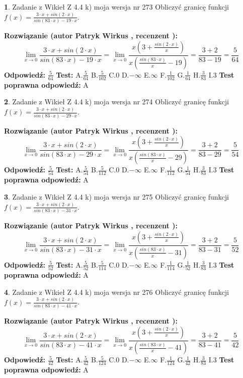 \documentclass[12pt, a4paper]{article}
\theoremstyle{definition} %
\newtheorem{zad}{}
\newcommand{\zadStart}[1]{\begin{zad}#1\newline}
\newcommand{\zadStop}{\end{zad}}
\newcommand{\rozwStart}[2]{\noindent \textbf{Rozwiązanie (autor #1 , recenzent #2): }\newline}
\newcommand{\rozwStop}{\newline}
\newcommand{\odpStart}{\noindent \textbf{Odpowiedź:}\newline}
\newcommand{\odpStop}{\newline}
\newcommand{\testStart}{\noindent \textbf{Test:}\newline}
\newcommand{\testStop}{\newline}
\newcommand{\kluczStart}{\noindent \textbf{Test poprawna odpowiedź:}\newline}
\newcommand{\kluczStop}{\newline}
\begin{document}
\zadStart{Zadanie z Wikieł Z 4.4 k) moja wersja nr 273}
Obliczyć granicę funkcji $f(x)=\frac{3\cdot x +sin(2\cdot x)}{sin(83\cdot x) -19\cdot x}$.
\zadStop
\rozwStart{Patryk Wirkus}{}
$$\lim\limits_{x\to 0}\frac{3\cdot x +sin(2\cdot x)}{sin(83\cdot x) -19\cdot x}
=\lim\limits_{x\to 0}\frac{x(3+\frac{sin(2\cdot x)}{x})}{x(\frac{sin(83\cdot x)}{x}-19)}
=\frac{3+2}{83-19} = \frac{5}{64}$$
\rozwStop
\odpStart
$\frac{5}{64}$
\odpStop
\testStart
A.$\frac{5}{64}$
B.$\frac{5}{102}$
C.$0$
D.$-\infty$
E.$\infty$
F.$\frac{1}{102}$
G.$\frac{1}{64}$
H.$\frac{3}{83}$
I.$3$
\testStop
\kluczStart
A
\kluczStop



\zadStart{Zadanie z Wikieł Z 4.4 k) moja wersja nr 274}
Obliczyć granicę funkcji $f(x)=\frac{3\cdot x +sin(2\cdot x)}{sin(83\cdot x) -29\cdot x}$.
\zadStop
\rozwStart{Patryk Wirkus}{}
$$\lim\limits_{x\to 0}\frac{3\cdot x +sin(2\cdot x)}{sin(83\cdot x) -29\cdot x}
=\lim\limits_{x\to 0}\frac{x(3+\frac{sin(2\cdot x)}{x})}{x(\frac{sin(83\cdot x)}{x}-29)}
=\frac{3+2}{83-29} = \frac{5}{54}$$
\rozwStop
\odpStart
$\frac{5}{54}$
\odpStop
\testStart
A.$\frac{5}{54}$
B.$\frac{5}{112}$
C.$0$
D.$-\infty$
E.$\infty$
F.$\frac{1}{112}$
G.$\frac{1}{54}$
H.$\frac{3}{83}$
I.$3$
\testStop
\kluczStart
A
\kluczStop



\zadStart{Zadanie z Wikieł Z 4.4 k) moja wersja nr 275}
Obliczyć granicę funkcji $f(x)=\frac{3\cdot x +sin(2\cdot x)}{sin(83\cdot x) -31\cdot x}$.
\zadStop
\rozwStart{Patryk Wirkus}{}
$$\lim\limits_{x\to 0}\frac{3\cdot x +sin(2\cdot x)}{sin(83\cdot x) -31\cdot x}
=\lim\limits_{x\to 0}\frac{x(3+\frac{sin(2\cdot x)}{x})}{x(\frac{sin(83\cdot x)}{x}-31)}
=\frac{3+2}{83-31} = \frac{5}{52}$$
\rozwStop
\odpStart
$\frac{5}{52}$
\odpStop
\testStart
A.$\frac{5}{52}$
B.$\frac{5}{114}$
C.$0$
D.$-\infty$
E.$\infty$
F.$\frac{1}{114}$
G.$\frac{1}{52}$
H.$\frac{3}{83}$
I.$3$
\testStop
\kluczStart
A
\kluczStop



\zadStart{Zadanie z Wikieł Z 4.4 k) moja wersja nr 276}
Obliczyć granicę funkcji $f(x)=\frac{3\cdot x +sin(2\cdot x)}{sin(83\cdot x) -41\cdot x}$.
\zadStop
\rozwStart{Patryk Wirkus}{}
$$\lim\limits_{x\to 0}\frac{3\cdot x +sin(2\cdot x)}{sin(83\cdot x) -41\cdot x}
=\lim\limits_{x\to 0}\frac{x(3+\frac{sin(2\cdot x)}{x})}{x(\frac{sin(83\cdot x)}{x}-41)}
=\frac{3+2}{83-41} = \frac{5}{42}$$
\rozwStop
\odpStart
$\frac{5}{42}$
\odpStop
\testStart
A.$\frac{5}{42}$
B.$\frac{5}{124}$
C.$0$
D.$-\infty$
E.$\infty$
F.$\frac{1}{124}$
G.$\frac{1}{42}$
H.$\frac{3}{83}$
I.$3$
\testStop
\kluczStart
A
\kluczStop
\end{document}

